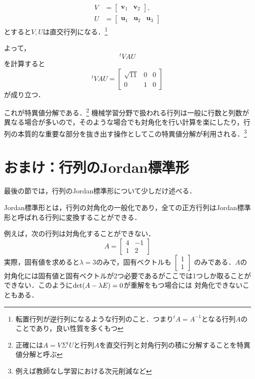 \documentclass[a4paper,12pt,autodetect-engine,dvipdfmx]{jsarticle}
\theoremstyle{definition}
\begin{document}
\begin{enumerate}
    \begin{align*}
        V &= \begin{bmatrix}
            \bm{v}_{1} & \bm{v}_{2}
        \end{bmatrix},\\
        U &= \begin{bmatrix}
            \bm{u}_{1} & \bm{u}_{2} & \bm{u}_{3}
        \end{bmatrix}
    \end{align*}
    とすると$V,U$は直交行列になる．\footnote{転置行列が逆行列になるような行列のこと．つまり$^{t}A = A^{-1}$となる行列$A$のことであり，良い性質を多くもつ}

    よって，
    \begin{equation*}
        ^{t}VAU
    \end{equation*}
    を計算すると
    \begin{equation*}
        ^{t}VAU=
        \begin{bmatrix}
            \sqrt{11} & 0 & 0\\
            0 & 1 & 0
        \end{bmatrix}
    \end{equation*}
    が成り立つ．
\end{enumerate}
これが特異値分解である．\footnote{正確には$A=V\Sigma {^{t}U}$と行列$A$を直交行列と対角行列の積に分解することを特異値分解と呼ぶ}
機械学習分野で扱われる行列は一般に行数と列数が異なる場合が多いので，そのような場合でも対角化を行い計算を楽にしたり，行列の本質的な重要な部分を抜き出す操作としてこの特異値分解が利用される．\footnote{例えば教師なし学習における次元削減など}

\section{おまけ：行列のJordan標準形}
最後の節では，行列のJordan標準形について少しだけ述べる．

Jordan標準形とは，行列の対角化の一般化であり，全ての正方行列はJordan標準形と呼ばれる行列に変換することができる．

例えば，次の行列は対角化することができない．
\begin{equation*}
    A=
    \begin{bmatrix}
        4 & -1\\
        1 & 2
    \end{bmatrix}
\end{equation*}
実際，固有値を求めると$\lambda = 3$のみで，固有ベクトルも
$\begin{bmatrix}
    1\\
    1
\end{bmatrix}$
のみである．$A$の対角化には固有値と固有ベクトルが2つ必要であるがここでは1つしか取ることができない．このように${\rm{det}}(A-\lambda E)=0$が重解をもつ場合には
対角化できないこともある．
\end{document}
